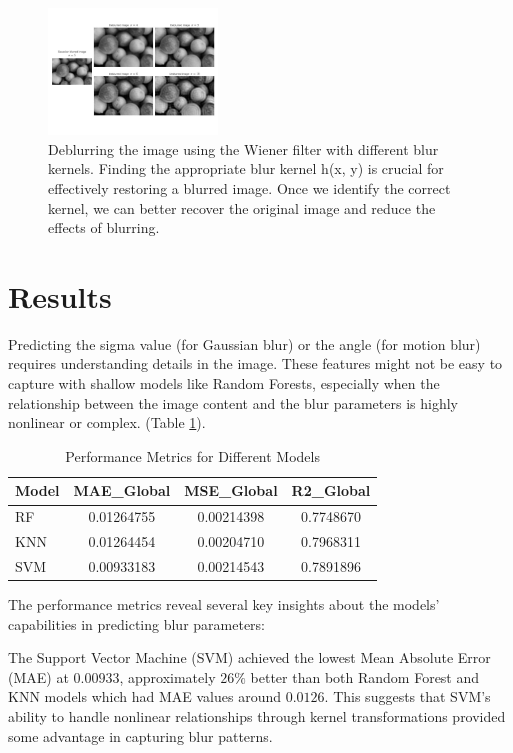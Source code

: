 \documentclass[twoside,11pt]{article}
\begin{document}
\begin{figure}[!ht]
\centering
\includegraphics[width=0.4\textwidth]{figure7.jpg}
\caption{Deblurring the image using the Wiener filter with different blur kernels. 
Finding the appropriate blur kernel  h(x, y)  is crucial for effectively restoring a blurred image. Once we identify the correct kernel, we can better recover the original image and reduce the effects of blurring.}
\end{figure}

\FloatBarrier 

\section{Results}
Predicting the sigma value (for Gaussian blur) or the angle (for motion blur) requires understanding details in the image. These features might not be easy to capture with shallow models like Random Forests, especially when the relationship between the image content and the blur parameters is highly nonlinear or complex. (Table \ref{tab:performance}).

\begin{table}[h]
\caption{Performance Metrics for Different Models}
\label{tab:performance}
\begin{center}
\begin{tabular}{lccc}
\hline
Model & MAE\_Global & MSE\_Global & R2\_Global \\
\hline
RF & 0.01264755 & 0.00214398 & 0.7748670 \\
KNN & 0.01264454 & 0.00204710 & 0.7968311 \\
SVM & 0.00933183 & 0.00214543 & 0.7891896 \\
\hline
\end{tabular}
\end{center}
\end{table}

The performance metrics reveal several key insights about the models' capabilities in predicting blur parameters:

The Support Vector Machine (SVM) achieved the lowest Mean Absolute Error (MAE) at $0.00933$, approximately $26\%$ better than both Random Forest and KNN models which had MAE values around $0.0126$. This suggests that SVM's ability to handle nonlinear relationships through kernel transformations provided some advantage in capturing blur patterns.
\end{document}
